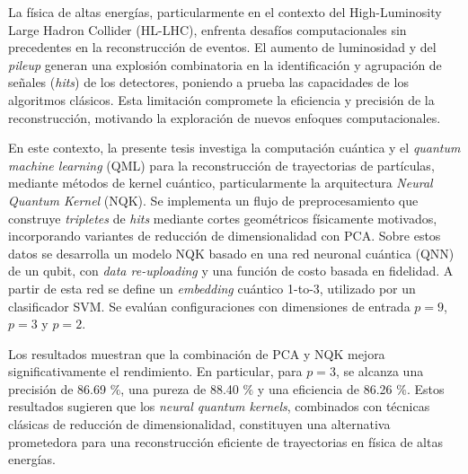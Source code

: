 
\newpage 
{} %
\begin{resumen}


\noindent La física de altas energías, particularmente en el contexto del High-Luminosity Large Hadron Collider (HL-LHC), enfrenta desafíos computacionales sin precedentes en la reconstrucción de eventos. El aumento de luminosidad y del \textit{pileup} generan una explosión combinatoria en la identificación y agrupación de señales (\textit{hits}) de los detectores, poniendo a prueba las capacidades de los algoritmos clásicos. Esta limitación compromete la eficiencia y precisión de la reconstrucción, motivando la exploración de nuevos enfoques computacionales.

En este contexto, la presente tesis investiga la computación cuántica y el \textit{quantum machine learning} (QML) para la reconstrucción de trayectorias de partículas, mediante métodos de kernel cuántico, particularmente la arquitectura \textit{Neural Quantum Kernel} (NQK). Se implementa un flujo de preprocesamiento que construye \textit{tripletes} de \textit{hits} mediante cortes geométricos físicamente motivados, incorporando variantes de reducción de dimensionalidad con PCA. Sobre estos datos se desarrolla un modelo NQK basado en una red neuronal cuántica (QNN) de un qubit, con \textit{data re-uploading} y una función de costo basada en fidelidad. A partir de esta red se define un  \textit{embedding} cuántico 1-to-3, utilizado por un clasificador SVM. Se evalúan configuraciones con dimensiones de entrada \(p=9\), \(p=3\) y \(p=2\).

Los resultados muestran que la combinación de PCA y NQK mejora significativamente el rendimiento. En particular, para \(p=3\), se alcanza una precisión de 86.69 $\%$, una pureza de 88.40 $\%$ y una eficiencia de 86.26 $\%$. Estos resultados sugieren que los \textit{neural quantum kernels}, combinados con técnicas clásicas de reducción de dimensionalidad, constituyen una alternativa prometedora para una reconstrucción eficiente de trayectorias en física de altas energías.

\vspace{0.5cm}
\noindent {}

\end{resumen}


\newpage

